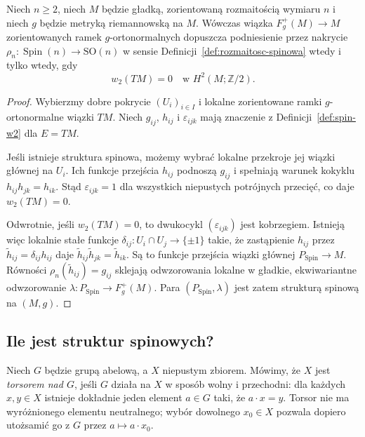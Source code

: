 \begin{twierdzenie}
\label{thm:spin-kryterium-w2}
Niech $n\geq2$, niech $M$ będzie gładką, zorientowaną
rozmaitością wymiaru $n$ i niech $g$ będzie metryką
riemannowską na $M$. Wówczas wiązka
$F^+_g(M)\to M$ zorientowanych ramek $g$-ortonormalnych
dopuszcza podniesienie przez nakrycie
$\rho_n:\operatorname{Spin}(n)\to\mathrm{SO}(n)$
w sensie Definicji~\ref{def:rozmaitosc-spinowa}
wtedy i tylko wtedy, gdy
\begin{equation}\label{eq:spin-kryterium-w2}
 w_2(TM)=0\quad\text{w }H^2(M;\mathbb Z/2).
\end{equation}
\end{twierdzenie}
\begin{proof}
Wybierzmy dobre pokrycie $(U_i)_{i\in I}$
i lokalne zorientowane ramki $g$-ortonormalne
wiązki $TM$. Niech $g_{ij}$, $h_{ij}$ i
$\varepsilon_{ijk}$ mają znaczenie z
Definicji~\ref{def:spin-w2} dla $E=TM$.

Jeśli istnieje struktura spinowa, możemy wybrać
lokalne przekroje jej wiązki głównej na $U_i$.
Ich funkcje przejścia $h_{ij}$ podnoszą $g_{ij}$
i spełniają warunek kokyklu $h_{ij}h_{jk}=h_{ik}$.
Stąd $\varepsilon_{ijk}=1$ dla wszystkich
niepustych potrójnych przecięć, co daje
$w_2(TM)=0$.

Odwrotnie, jeśli $w_2(TM)=0$, to dwukocykl
$(\varepsilon_{ijk})$ jest kobrzegiem.
Istnieją więc lokalnie stałe funkcje
$\delta_{ij}:U_i\cap U_j\to\{\pm1\}$
takie, że zastąpienie $h_{ij}$ przez
$\widetilde h_{ij}=\delta_{ij}h_{ij}$ daje
$\widetilde h_{ij}\widetilde h_{jk}=\widetilde h_{ik}$.
Są to funkcje przejścia wiązki głównej
$P_{\mathrm{Spin}}\to M$. Równości
$\rho_n(\widetilde h_{ij})=g_{ij}$ sklejają
odwzorowania lokalne w gładkie, ekwiwariantne
odwzorowanie $\lambda:P_{\mathrm{Spin}}\to F^+_g(M)$.
Para $(P_{\mathrm{Spin}},\lambda)$ jest zatem
strukturą spinową na $(M,g)$.
\end{proof}

\subsection{Ile jest struktur spinowych?}

\begin{definicja}[Torsor]
\label{def:spin-torsor}
Niech $G$ będzie grupą abelową, a $X$ niepustym zbiorem.
Mówimy, że $X$ jest \emph{torsorem nad $G$},
jeśli $G$ działa na $X$ w sposób wolny i przechodni:
dla każdych $x,y\in X$ istnieje dokładnie jeden
element $a\in G$ taki, że $a\cdot x=y$.
Torsor nie ma wyróżnionego elementu neutralnego;
wybór dowolnego $x_0\in X$ pozwala dopiero
utożsamić go z $G$ przez $a\mapsto a\cdot x_0$.
\end{definicja}

